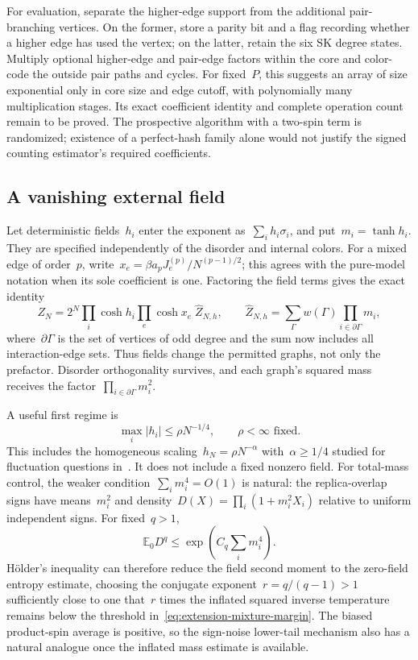\documentclass[10pt]{article}
\theoremstyle{plain}
\theoremstyle{definition}
\theoremstyle{remark}
\begin{document}
For evaluation, separate the higher-edge support from the additional pair-branching vertices. On the former, store a parity bit and a flag recording whether a higher edge has used the vertex; on the latter, retain the six SK degree states. Multiply optional higher-edge and pair-edge factors within the core and color-code the outside pair paths and cycles. For fixed~$P$, this suggests an array of size exponential only in core size and edge cutoff, with polynomially many multiplication stages. Its exact coefficient identity and complete operation count remain to be proved. The prospective algorithm with a two-spin term is randomized; existence of a perfect-hash family alone would not justify the signed counting estimator's required coefficients.

\subsection{A vanishing external field}
Let deterministic fields~$h_i$ enter the exponent as~$\sum_i h_i\sigma_i$, and put~$m_i=\tanh h_i$. They are specified independently of the disorder and internal colors. For a mixed edge of order~$p$, write~$x_e=\beta a_pJ_e^{(p)}/N^{(p-1)/2}$; this agrees with the pure-model notation when its sole coefficient is one. Factoring the field terms gives the exact identity
\begin{equation}\label{eq:extension-field}
 Z_N=2^N\prod_i\cosh h_i\prod_e\cosh x_e\;\hat Z_{N,h},
 \qquad
 \hat Z_{N,h}=\sum_{\Gamma}w(\Gamma)
              \prod_{i\in\partial\Gamma}m_i,
\end{equation}
where~$\partial\Gamma$ is the set of vertices of odd degree and the sum now includes all interaction-edge sets. Thus fields change the permitted graphs, not only the prefactor. Disorder orthogonality survives, and each graph's squared mass receives the factor~$\prod_{i\in\partial\Gamma}m_i^2$.

A useful first regime is
\begin{equation}\label{eq:extension-weak-field}
 \max_i|h_i|\le\rho N^{-1/4},\qquad \rho<\infty\text{ fixed}.
\end{equation}
This includes the homogeneous scaling~$h_N=\rho N^{-\alpha}$ with~$\alpha\ge1/4$ studied for fluctuation questions in~\cite{DW26}. It does not include a fixed nonzero field. For total-mass control, the weaker condition~$\sum_i m_i^4=O(1)$ is natural: the replica-overlap signs have means~$m_i^2$ and density~$D(X)=\prod_i(1+m_i^2X_i)$ relative to uniform independent signs. For fixed~$q>1$,
\begin{equation*}
 \mathbb E_0D^q\le\exp\!\left(C_q\sum_i m_i^4\right).
\end{equation*}
H\"older's inequality can therefore reduce the field second moment to the zero-field entropy estimate, choosing the conjugate exponent~$r=q/(q-1)>1$ sufficiently close to one that~$r$ times the inflated squared inverse temperature remains below the threshold in~\eqref{eq:extension-mixture-margin}. The biased product-spin average is positive, so the sign-noise lower-tail mechanism also has a natural analogue once the inflated mass estimate is available.
\end{document}
